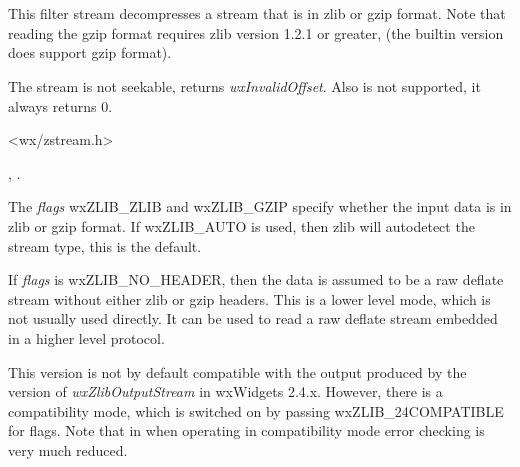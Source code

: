 \section{}\label{wxzlibinputstream}

This filter stream decompresses a stream that is in zlib or gzip format.
Note that reading the gzip format requires zlib version 1.2.1 or greater,
(the builtin version does support gzip format).

The stream is not seekable,  returns
 {\it wxInvalidOffset}. Also  is
not supported, it always returns $0$.




<wx/zstream.h>


, 
 .


\label{wxzlibinputstreamwxzlibinputstream}


The {\it flags} wxZLIB\_ZLIB and wxZLIB\_GZIP specify whether the input data
is in zlib or gzip format. If wxZLIB\_AUTO is used, then zlib will
autodetect the stream type, this is the default.

If {\it flags} is wxZLIB\_NO\_HEADER, then the data is assumed to be a raw
deflate stream without either zlib or gzip headers. This is a lower level
mode, which is not usually used directly. It can be used to read a raw
deflate stream embedded in a higher level protocol.

This version is not by default compatible with the output produced by
the version of {\it wxZlibOutputStream} in wxWidgets 2.4.x. However,
there is a compatibility mode, which is switched on by passing
wxZLIB\_24COMPATIBLE for flags. Note that in when operating in compatibility
mode error checking is very much reduced.

